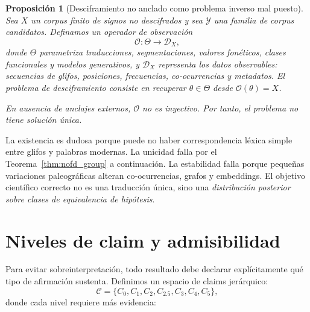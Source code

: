 \documentclass[11pt,a4paper]{article}
\newtheorem{proposition}[theorem]{Proposición}
\newcommand{\1}{\mathbf{1}}
\numberwithin{equation}{section}
\begin{document}
\begin{proposition}[Desciframiento no anclado como problema inverso mal puesto]
\label{prop:ill_posed}
Sea $X$ un corpus finito de signos no descifrados y sea $\mathcal{Y}$ una familia de corpus candidatos. Definamos un operador de observación
\begin{equation}
    \mathcal{O}:\Theta\to\mathcal{D}_X,
\end{equation}
donde $\Theta$ parametriza traducciones, segmentaciones, valores fonéticos, clases funcionales y modelos generativos, y $\mathcal{D}_X$ representa los datos observables: secuencias de glifos, posiciones, frecuencias, co-ocurrencias y metadatos. El problema de desciframiento consiste en recuperar $\theta\in\Theta$ desde $\mathcal{O}(\theta)=X$.

En ausencia de anclajes externos, $\mathcal{O}$ no es inyectivo. Por tanto, el problema no tiene solución única.
\end{proposition}

La existencia es dudosa porque puede no haber correspondencia léxica simple entre glifos y palabras modernas. La unicidad falla por el Teorema~\ref{thm:nofd_group} a continuación. La estabilidad falla porque pequeñas variaciones paleográficas alteran co-ocurrencias, grafos y embeddings. El objetivo científico correcto no es una traducción única, sino una \emph{distribución posterior sobre clases de equivalencia de hipótesis}.

\section{Niveles de claim y admisibilidad}
\label{sec:claim_levels}

Para evitar sobreinterpretación, todo resultado debe declarar explícitamente qué tipo de afirmación sustenta. Definimos un espacio de claims jerárquico:
\begin{equation}
    \mathcal{C}=\{C_0,C_1,C_2,C_{2.5},C_3,C_4,C_5\},
\end{equation}
donde cada nivel requiere más evidencia:
\end{document}

